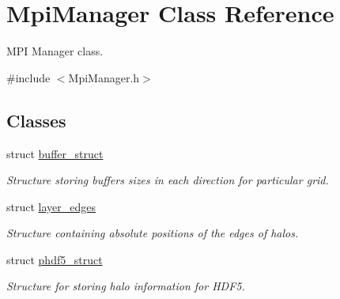 \hypertarget{class_mpi_manager}{}\section{Mpi\+Manager Class Reference}
\label{class_mpi_manager}


M\+PI Manager class.  




{\ttfamily \#include $<$Mpi\+Manager.\+h$>$}

\subsection*{Classes}
\begin{DoxyCompactItemize}
\item 
struct \hyperlink{struct_mpi_manager_1_1buffer__struct}{buffer\+\_\+struct}
\begin{DoxyCompactList}\small\item\em Structure storing buffers sizes in each direction for particular grid. \end{DoxyCompactList}\item 
struct \hyperlink{struct_mpi_manager_1_1layer__edges}{layer\+\_\+edges}
\begin{DoxyCompactList}\small\item\em Structure containing absolute positions of the edges of halos. \end{DoxyCompactList}\item 
struct \hyperlink{struct_mpi_manager_1_1phdf5__struct}{phdf5\+\_\+struct}
\begin{DoxyCompactList}\small\item\em Structure for storing halo information for H\+D\+F5. \end{DoxyCompactList}\end{DoxyCompactItemize}
